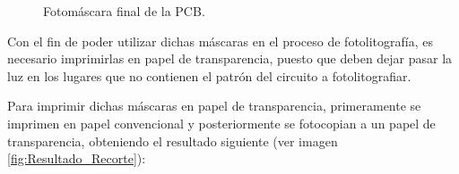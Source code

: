 \begin{enumerate}
    \begin{figure}[H]
    \centering
    \caption{Fotomáscara final de la \ac{PCB}.} 
    \label{fig:Mascara_Final}
    \end{figure}
    
   Con el fin de poder utilizar dichas máscaras en el proceso de fotolitografía, es necesario imprimirlas en papel de transparencia, puesto que deben dejar pasar la luz en los lugares que no contienen el patrón del circuito a fotolitografiar.
   
   Para imprimir dichas máscaras en papel de transparencia, primeramente se imprimen en papel convencional y posteriormente se fotocopian a un papel de transparencia, obteniendo el resultado siguiente (ver imagen \ref{fig:Resultado_Recorte}):
   

\end{enumerate}
